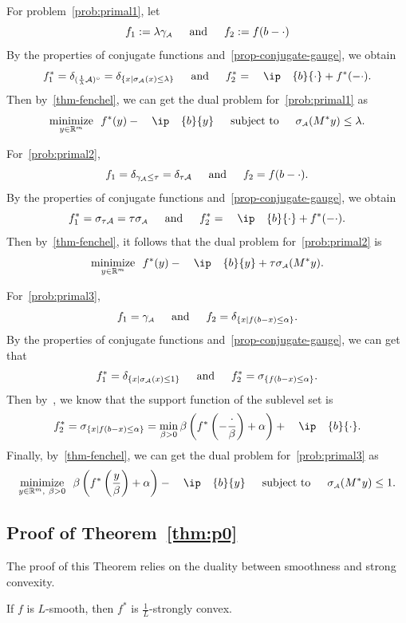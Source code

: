 For problem~\eqref{prob:primal1}, let
\[
  f_1 := \lambda\gamma_{\scriptscriptstyle\mathcal{A}} \enspace\hbox{\quad and\quad}\enspace f_2 := f(b - \cdot)
\]
By the properties of conjugate functions and~\autoref{prop-conjugate-gauge}, we obtain 
\[
  f_1^* =  \delta_{(\frac{1}{\lambda}\Ascr)^\circ} = \delta_{\{x\mid \sigma\As(x)\leq\lambda\}} \enspace\text{and}\enspace f_2^* = \ip{b}{\cdot} + f^*(-\cdot).
\]
Then by~\autoref{thm-fenchel}, we can get the dual problem for~\eqref{prob:primal1} as
\[\minimize{y\in\Re^m} f^*(y) - \ip{b}{y} \enspace\text{subject to}\enspace \sigma\As(M^*y)\leq\lambda.\]

For~\eqref{prob:primal2},
\[f_1 = \delta_{\gamma_{\scriptscriptstyle\mathcal{A}}\leq\tau} = \delta_{\tau\mathcal{A}} \enspace\hbox{\quad and\quad}\enspace f_2 = f(b - \cdot).
\]
By the properties of conjugate functions and~\autoref{prop-conjugate-gauge}, we obtain 
\[f_1^* = \sigma_{\tau\Ascr} = \tau\sigma\As \enspace\text{and}\enspace f_2^* = \ip{b}{\cdot} + f^*(-\cdot).
\]
Then by~\autoref{thm-fenchel}, it follows that the dual problem for~\eqref{prob:primal2} is 
\[\minimize{y\in\Re^m} f^*(y) - \ip{b}{y} + \tau\sigma\As(M^*y).\]

For~\eqref{prob:primal3},
\[
  f_1 = \gamma_{\scriptscriptstyle\mathcal{A}} \enspace\hbox{\quad and\quad}\enspace f_2 = \delta_{\{x\mid f(b - x)\leq\alpha\}}.
\]
By the properties of conjugate functions and~\autoref{prop-conjugate-gauge}, we can get that 
\[
  f_1^* = \delta_{\{x\mid \sigma_{\scriptscriptstyle\mathcal{A}}(x)\leq1\}} \enspace\hbox{\quad and\quad}\enspace f_2^* = \sigma_{\{f(b - x)\leq\alpha\}}.\]
Then by~\cite[Example~E.2.5.3]{hiriart-urruty01}, we know that the support function of the sublevel set is 
\[f_2^* = \sigma_{\{x\mid f(b - x)\leq\alpha\}} = \min_{\beta > 0} \beta\left(f^*\left(-\frac{\cdot}{\beta}\right) + \alpha\right) + \ip{b}{\cdot}.\]
Finally, by~\autoref{thm-fenchel}, we can get the dual problem for~\eqref{prob:primal3} as
\[\minimize{y\in\Re^m,\ \beta > 0} \beta \left( f^*\left( \frac{y}{\beta} \right) + \alpha \right) - \ip{b}{y} \enspace \text{subject to}\enspace \sigma\As(M^* y) \leq 1.\]


\subsection{Proof of Theorem~\ref{thm:p0}} \label{app:main_proof}

The proof of this Theorem relies on the duality between smoothness and strong convexity.
\begin{lemma} \label{lemma:conjugate}
   If $f$ is $L$-smooth, then $f^*$ is $\frac{1}{L}$-strongly convex.
\end{lemma}

